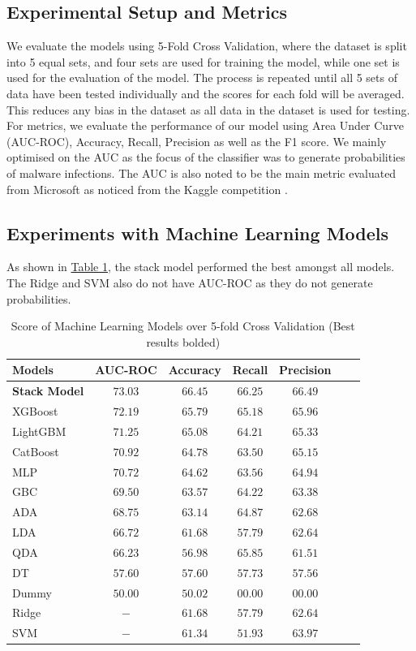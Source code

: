 \documentclass[pdflatex,sn-basic,Numbered]{sn-jnl}%
\theoremstyle{thmstyleone}%
\theoremstyle{thmstyletwo}%
\theoremstyle{thmstylethree}%
\newcommand{\reftable}[1]{\hyperref[#1]{Table \ref*{#1}}}
\begin{document}
\subsection{Experimental Setup and Metrics}We evaluate the models using 5-Fold Cross Validation, where the dataset is split into 5 equal sets, and four sets are used for training the model, while one set is used for the evaluation of the model. The process is repeated until all 5 sets of data have been tested individually and the scores for each fold will be averaged. This reduces any bias in the dataset as all data in the dataset is used for testing. For metrics, we evaluate the performance of our model using Area Under Curve (AUC-ROC), Accuracy, Recall, Precision as well as the F1 score. We mainly optimised on the AUC as the focus of the classifier was to generate probabilities of malware infections. The AUC is also noted to be the main metric evaluated from Microsoft as noticed from the Kaggle competition \cite{microsoft-malware-prediction}. 


\subsection{Experiments with Machine Learning Models}
As shown in \reftable{tab:allaimodels}, the stack model performed the best amongst all models. The Ridge and SVM also do not have AUC-ROC as they do not generate probabilities.
\begin{table}
\centering
\caption{Score of Machine Learning Models over 5-fold Cross Validation (Best results bolded)}
\label{tab:allaimodels}
\begin{tabular}{@{}lcccccc@{}}
\toprule
 {\bf Models} & {\bf AUC-ROC} & {\bf Accuracy} & {\bf Recall} & {\bf Precision} \\ \midrule %
 \textbf{Stack Model} & $\mathbf{73.03}$ & $\mathbf{66.45}$ & $\mathbf{66.25}$ & $\mathbf{66.49}$ \\ 
XGBoost & $72.19$ & $65.79$ & $65.18$ & $65.96$ \\
LightGBM & $71.25$ & $65.08$ & $64.21$ & $65.33$ \\ 
CatBoost & $70.92$ & $64.78$ & $63.50$ & $65.15$ \\ 
MLP & $70.72$ & $64.62 $ & $63.56$ & $64.94$ \\ 
GBC & $69.50$ & $63.57 $ & $64.22$ & $63.38$ \\ 
ADA & $68.75$ & $63.14$ & $64.87$ & $62.68$ \\ 
LDA & $66.72$ & $61.68$ & $57.79$ & $62.64$ \\ 
QDA & $66.23$ & $56.98$ & $65.85$ & $61.51$ \\ 
DT & $57.60$ & $57.60$ & $57.73$ & $57.56$ \\ 
Dummy & $50.00$ & $50.02$ & $00.00$ & $00.00$ \\ 
Ridge & $-$ & $61.68$ & $57.79$ & $62.64$ \\
SVM & $-$ & $61.34$ & $51.93$ & $63.97$ \\ \bottomrule
\end{tabular}%
\vspace{-1ex}
\end{table}
\end{document}
